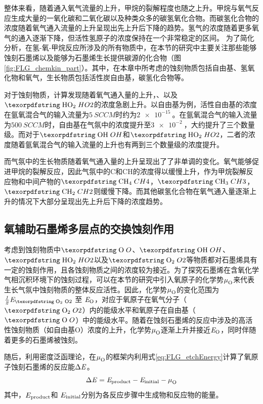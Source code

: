 整体来看，随着通入氧气流量的上升，甲烷的裂解程度也随之上升。甲烷与氧气反应生成大量的一氧化碳和二氧化碳以及种类众多的碳氢氧化合物。而碳氢化合物的浓度随着氧气通入流量的上升呈现出先上升后下降的趋势。氢气的浓度随着更多氧气的通入逐渐下降，但活性氢原子的浓度保持在一个非常稳定的区间。
为了简化分析，在氢-氧-甲烷反应所涉及的所有物质中，在本节的研究中主要关注那些能够蚀刻石墨烯以及能够为石墨烯生长提供碳源的化合物（图\ref{fig:FLG_chemkin_part}）。其中，在本章中所考虑的蚀刻物质包括自由基、氢氧化物和氧气，生长物质包括活性炭自由基，碳氢化合物等。

对于蚀刻物质，计算发现随着氧气通入量的上升，、以及$\cemb{HO2}$的浓度急剧上升。以自由基为例，活性自由基的浓度在氩氧混合气的输入流量为$\SI{5}{SCCM}$时约为$\SI{2e-15}{}$。在氩氧混合气的输入流量为$\SI{500}{SCCM}$时，自由基在气氛中的浓度提升至$\SI{3e-2}{}$，大约提升了三个数量级。而对于$\cemb{OH}$和$\cemb{HO2}$，二者的浓度随着氩氧混合气的输入流量的上升也有两到三个数量级的浓度提升。

而气氛中的生长物质随着氧气通入量的上升呈现出了了非单调的变化。氧气能够促进甲烷的裂解反应，因此气氛中的C和CH的浓度得以缓慢上升，作为甲烷裂解反应物和中间产物的$\cemb{CH4}$，$\cemb{CH3}$，$\cemb{CH2}$则缓慢下降。而其他碳氢化合物在氧气通入量逐渐上升的情况下大部分呈现出先上升后下降的浓度趋势。
\subsection{氧辅助石墨烯多层点的交换蚀刻作用}
\label{subsec:FLG_Oetch}

考虑到蚀刻物质中$\cemb{O}$、$\cemb{OH}$、$\cemb{HO2}$以及$\cemb{O2}$等物质都对石墨烯具有一定的蚀刻作用，且各蚀刻物质之间的浓度较为接近。为了探究石墨烯在含氧化学气相沉积环境下的蚀刻过程，可以在本节的研究中引入氧原子的化学势$\it \mu_{\rm O}^{\rm } \it$来代表生长气氛中蚀刻物质的整体反应活性。因此，化学势$\it \mu_{\rm O}^{\rm } \it$的变化范围为$\halfEOm$ 至 $\it E_{\rm O} \it$，对应于氧原子在氧气分子（$\cemb{O2}$）内的能级水平和氧原子在自由基（$\cemb{O}$）中的能级水平。随着在蚀刻石墨烯的反应中涉及的高活性蚀刻物质（如自由基O）浓度的上升，化学势$\it \mu_{\rm O}^{\rm } \it$逐渐上升并接近$\it E_{\rm O} \it$，同时伴随着更多的石墨烯被蚀刻。

随后，利用密度泛函理论，在$\it \mu_{\rm O}^{\rm } \it$的框架内利用式\eqref{eq:FLG_etchEnergy}计算了氧原子蚀刻石墨烯的反应能$\rm{\Delta} \it E$。
\begin{equation}
    \label{eq:FLG_etchEnergy}
    \rm{\Delta} \it E = E_{\rm product} - E_{\rm initial} - \it \mu_{\rm O}^{\rm } \it
\end{equation}
其中，$E_{\rm product}$和 $E_{\rm initial}$分别为各反应步骤中生成物和反应物的能量。

